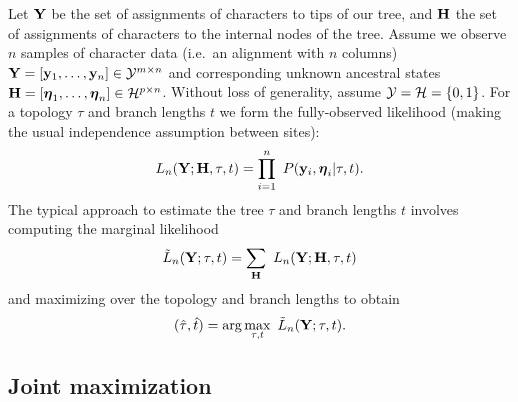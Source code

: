 \documentclass[a4paper]{article}
\begin{document}
Let $\mathbf{Y}$ be the set of assignments of characters to tips of our tree, and $\mathbf{H}$ the set of assignments of characters to the internal nodes of the tree.
Assume we observe $n$ samples of character data (i.e.\ an alignment with $n$ columns) $\mathbf{Y}=[\mathbf{y}_1,\ldots,\mathbf{y}_n]\in\mathcal{Y}^{m\times n}$ and corresponding unknown ancestral states $\mathbf{H}=[\boldsymbol\eta_1,\ldots,\boldsymbol\eta_n]\in\mathcal{H}^{p\times n}$.
Without loss of generality, assume $\mathcal{Y}=\mathcal{H}=\{0,1\}$.
For a topology $\tau$ and branch lengths $t$ we form the fully-observed likelihood (making the usual independence assumption between sites):
\begin{equation}
\label{eq:full_likelihood}
L_n(\fullAlignment;\fullAncestralStates, \tau, t) = \prod_{i=1}^{n} \ P(\alignmentColumn_i, \ancestralStateColumn_i | \tau, t).
\end{equation}
The typical approach to estimate the tree $\tau$ and branch lengths $t$ involves computing the marginal likelihood
\begin{equation}
\label{eq:marginal_likelihood}
\tilde{L}_n(\fullAlignment; \tau, t) = \sum_{\fullAncestralStates} \ L_n(\fullAlignment;\fullAncestralStates, \tau, t)
\end{equation}
and maximizing over the topology and branch lengths to obtain
$$
(\hat{\tau}, \hat{t}) = \arg\max_{\tau, t} \  \tilde{L}_n(\mathbf{Y}; \tau, t).
$$

\subsection{Joint maximization}
\end{document}
